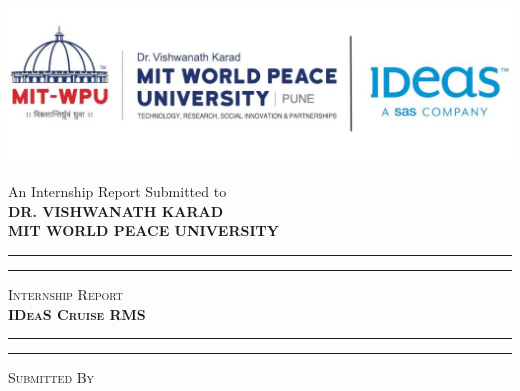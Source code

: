\documentclass[openany, 11pt]{report} %
\begin{document}
\begin{titlepage}
    \centering


    \vspace{1\baselineskip} %
    \includegraphics[width=1\textwidth]{logo.jpg} %


    \LARGE{
        An Internship Report Submitted to\\
        \textbf{DR. VISHWANATH KARAD\\
        MIT WORLD PEACE UNIVERSITY}\\
    }

    \vfill %


    \rule{\textwidth}{1.6pt}\vspace*{-\baselineskip}\vspace*{2pt}
    \rule{\textwidth}{0.6pt}
    \vspace{0.3\baselineskip} %


    \huge{\textsc{
            Internship Report\\
            \textbf{IDeaS Cruise RMS}
        }} \\


    \vspace{0.3\baselineskip} %
    \rule{\textwidth}{0.6pt}\vspace*{-\baselineskip}\vspace*{2.8pt}
    \rule{\textwidth}{1.6pt}

    \vspace{1\baselineskip} %


    \LARGE\textsc{
        Submitted By
    } %



\end{titlepage}
\end{document}
